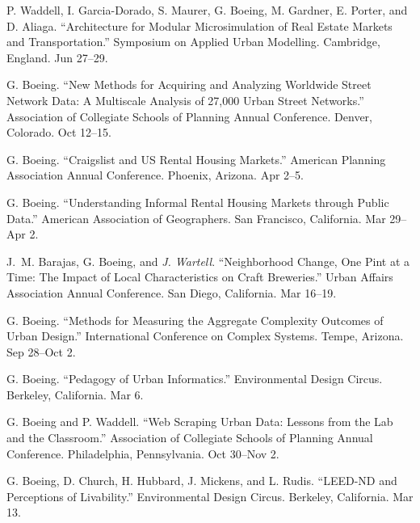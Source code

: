 \documentclass[11pt,letterpaper]{report} %
\begin{document}
\begin{tablist}
\item[2018] \tab{}P. Waddell, I. Garcia-Dorado, S. Maurer, G. Boeing, M. Gardner, E. Porter, and D. Aliaga. \enquote{Architecture for Modular Microsimulation of Real Estate Markets and Transportation.} Symposium on Applied Urban Modelling. Cambridge, England. Jun 27--29.

\item[2017] \tab{}G. Boeing. \enquote{New Methods for Acquiring and Analyzing Worldwide Street Network Data: A Multiscale Analysis of 27,000 Urban Street Networks.} Association of Collegiate Schools of Planning Annual Conference. Denver, Colorado. Oct 12--15.

\item[2016] \tab{}G. Boeing. \enquote{Craigslist and US Rental Housing Markets.} American Planning Association Annual Conference. Phoenix, Arizona. Apr 2--5.

\item[2016] \tab{}G. Boeing. \enquote{Understanding Informal Rental Housing Markets through Public Data.} American Association of Geographers. San Francisco, California. Mar 29--Apr 2.

\item[2016] \tab{}J.~M. Barajas, G. Boeing, and \textit{J. Wartell}. \enquote{Neighborhood Change, One Pint at a Time: The Impact of Local Characteristics on Craft Breweries.} Urban Affairs Association Annual Conference. San Diego, California. Mar 16--19.

\item[2015] \tab{}G. Boeing. \enquote{Methods for Measuring the Aggregate Complexity Outcomes of Urban Design.} International Conference on Complex Systems. Tempe, Arizona. Sep 28--Oct 2.

\item[2015] \tab{}G. Boeing. \enquote{Pedagogy of Urban Informatics.} Environmental Design Circus. Berkeley, California. Mar 6.

\item[2014] \tab{}G. Boeing and P. Waddell. \enquote{Web Scraping Urban Data: Lessons from the Lab and the Classroom.} Association of Collegiate Schools of Planning Annual Conference. Philadelphia, Pennsylvania. Oct 30--Nov 2.

\item[2014] \tab{}G. Boeing, D. Church, H. Hubbard, J. Mickens, and L. Rudis. \enquote{LEED-ND and Perceptions of Livability.} Environmental Design Circus. Berkeley, California. Mar 13.

\end{tablist}
\end{document}
